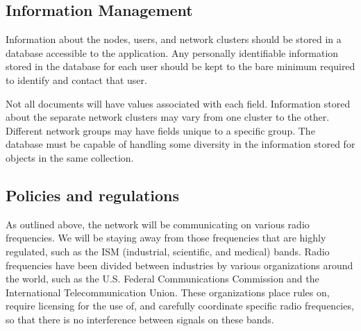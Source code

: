 \documentclass[tikz,a4paper,titlepage]{article}
\begin{document}
\subsection{Information Management} %

Information about the nodes, users, and network clusters should be stored in a database accessible to the application. Any personally identifiable information stored in the database for each user should be kept to the bare minimum required to identify and contact that user. 

Not all documents will have values associated with each field. Information stored about the separate network clusters may vary from one cluster to the other. Different network groups may have fields unique to a specific group. The database must be capable of handling some diversity in the information stored for objects in the same collection.  




\subsection{Policies and regulations} %
As outlined above, the network will be communicating on various radio frequencies. We will be staying away from those frequencies that are highly regulated, such as the ISM (industrial, scientific, and medical) bands. Radio frequencies have been divided between industries by various organizations around the world, such as the U.S. Federal Communications Commission and the International Telecommunication Union. These organizations place rules on, require licensing for the use of, and carefully coordinate specific radio frequencies, so that there is no interference between signals on these bands.
\end{document}
